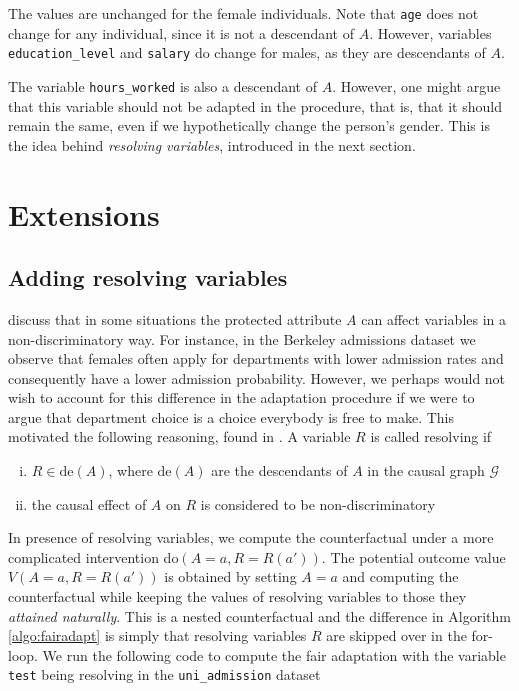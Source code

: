 \documentclass[
  notitle]{jss}
\begin{document}
The values are unchanged for the female individuals. Note that
\texttt{age} does not change for any individual, since it is not a
descendant of \(A\). However, variables \texttt{education\_level} and
\texttt{salary} do change for males, as they are descendants of \(A\).

The variable \texttt{hours\_worked} is also a descendant of \(A\).
However, one might argue that this variable should not be adapted in the
procedure, that is, that it should remain the same, even if we
hypothetically change the person's gender. This is the idea behind
\textit{resolving variables}, introduced in the next section.

\hypertarget{extensions}{%
\section{Extensions}\label{extensions}}

\label{Extensions}

\hypertarget{adding-resolving-variables}{%
\subsection{Adding resolving
variables}\label{adding-resolving-variables}}

\cite{kilbertus2017avoiding} discuss that in some situations the
protected attribute \(A\) can affect variables in a non-discriminatory
way. For instance, in the Berkeley admissions dataset
\citep{bickel1975sex} we observe that females often apply for
departments with lower admission rates and consequently have a lower
admission probability. However, we perhaps would not wish to account for
this difference in the adaptation procedure if we were to argue that
department choice is a choice everybody is free to make. This motivated
the following reasoning, found in \citet{kilbertus2017avoiding}. A
variable \(R\) is called resolving if

\begin{enumerate}[(i)]
        \item $R \in \mathrm{de}(A)$, where $\mathrm{de}(A)$ are the descendants of $A$ in the causal graph $\mathcal{G}$
        \item the causal effect of $A$ on $R$ is considered to be non-discriminatory
\end{enumerate}

In presence of resolving variables, we compute the counterfactual under
a more complicated intervention do\((A = a, R = R(a'))\). The potential
outcome value \(V(A = a, R = R(a'))\) is obtained by setting \(A = a\)
and computing the counterfactual while keeping the values of resolving
variables to those they \textit{attained naturally}. This is a nested
counterfactual and the difference in Algorithm \ref{algo:fairadapt} is
simply that resolving variables \(R\) are skipped over in the for-loop.
We run the following code to compute the fair adaptation with the
variable \texttt{test} being resolving in the \texttt{uni\_admission}
dataset
\end{document}
